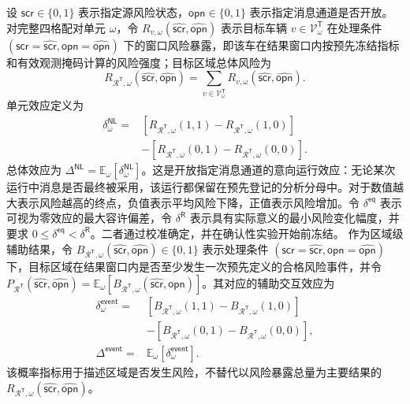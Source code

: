 \documentclass[10pt,a4paper,twocolumn]{article}
\newcommand{\revGreen}[1]{#1}
\begin{document}
\revGreen{设 $\mathsf{scr}\in\{0,1\}$ 表示指定源风险状态，$\mathsf{opn}\in\{0,1\}$ 表示指定消息通道是否开放。对完整四格配对单元 $\omega$，令 $R_{v,\omega}(\hat{\mathsf{scr}},\hat{\mathsf{opn}})$ 表示目标车辆 $v\in\mathcal V^{\mathsf T}_{\omega}$ 在处理条件 $(\mathsf{scr}=\hat{\mathsf{scr}},\mathsf{opn}=\hat{\mathsf{opn}})$ 下的窗口风险暴露，即该车在结果窗口内按预先冻结指标和有效观测掩码计算的风险强度；目标区域总体风险为}
\begin{equation}
R_{\mathcal R^{\mathsf T},\omega}(\hat{\mathsf{scr}},\hat{\mathsf{opn}})=\sum_{v\in\mathcal V^{\mathsf T}_{\omega}}R_{v,\omega}(\hat{\mathsf{scr}},\hat{\mathsf{opn}}).
\end{equation}
单元效应定义为
\begin{equation}
\begin{aligned}
\delta_{\omega}^{\mathsf{NL}}={}&[R_{\mathcal R^{\mathsf T},\omega}(1,1)-R_{\mathcal R^{\mathsf T},\omega}(1,0)]\\
&-[R_{\mathcal R^{\mathsf T},\omega}(0,1)-R_{\mathcal R^{\mathsf T},\omega}(0,0)].
\end{aligned}
\end{equation}
总体效应为 $\Delta^{\mathsf{NL}}=\mathbb E_\omega[\delta_\omega^{\mathsf{NL}}]$。这是开放指定消息通道的意向运行效应：无论某次运行中消息是否最终被采用，该运行都保留在预先登记的分析分母中。对于数值越大表示风险越高的终点，负值表示平均风险下降，正值表示风险增加。令 $\delta^{\mathsf{eq}}$ 表示可视为零效应的最大容许偏差，令 $\delta^{\mathsf R}$ 表示具有实际意义的最小风险变化幅度，并要求 $0\leq\delta^{\mathsf{eq}}<\delta^{\mathsf R}$。二者通过校准确定，并在确认性实验开始前冻结。
作为区域级辅助结果，令 $B_{\mathcal R^{\mathsf T},\omega}(\hat{\mathsf{scr}},\hat{\mathsf{opn}})\in\{0,1\}$ 表示处理条件 $(\mathsf{scr}=\hat{\mathsf{scr}},\mathsf{opn}=\hat{\mathsf{opn}})$ 下，目标区域在结果窗口内是否至少发生一次预先定义的合格风险事件，并令 $P_{\mathcal R^{\mathsf T}}(\hat{\mathsf{scr}},\hat{\mathsf{opn}})=\mathbb E_\omega[B_{\mathcal R^{\mathsf T},\omega}(\hat{\mathsf{scr}},\hat{\mathsf{opn}})]$。其对应的辅助交互效应为
\begin{equation}
\begin{aligned}
\delta_{\omega}^{\mathsf{event}}={}&[B_{\mathcal R^{\mathsf T},\omega}(1,1)-B_{\mathcal R^{\mathsf T},\omega}(1,0)]\\
&-[B_{\mathcal R^{\mathsf T},\omega}(0,1)-B_{\mathcal R^{\mathsf T},\omega}(0,0)],\\
\Delta^{\mathsf{event}}={}&\mathbb E_\omega[\delta_{\omega}^{\mathsf{event}}].
\end{aligned}
\end{equation}
该概率指标用于描述区域是否发生风险，不替代以风险暴露总量为主要结果的 $R_{\mathcal R^{\mathsf T},\omega}(\hat{\mathsf{scr}},\hat{\mathsf{opn}})$。
\end{document}
